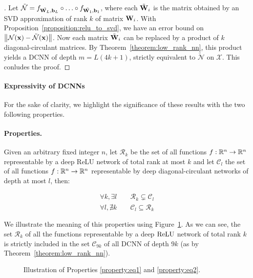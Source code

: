 \begin{proof}[]
Let $\tilde{\mathcal{N}} = f_{\tilde{\mathbf{W}_{L}},\mathbf{b}_{L}} \circ \ldots \circ f_{\tilde{\mathbf{W}_{1}},\mathbf{b}_{1}}$, where each $\tilde{\mathbf{W}}_{i}$ is the matrix obtained by an SVD approximation of rank $k$ of matrix $\mathbf{W}_{i}$.
With Proposition~\ref{proposition:relu_to_svd}, we have an error bound on $\norm{\mathcal{N} \left(\xvec\right) - \tilde{\mathcal{N}} \left(\xvec\right)}$.
Now each matrix $\tilde{\mathbf{W}}_{i}$ can be replaced by a product of $k$ diagonal-circulant matrices.
By Theorem~\ref{theorem:low_rank_nn}, this product yields a DCNN of depth $m = L(4k+1)$, strictly equivalent to $\tilde{\mathcal{N}}$ on $\mathcal{X}$.
This conludes the proof.
\end{proof}



\paragraph{Expressivity of DCNNs}

For the sake of clarity, we highlight the significance of these results with the two following properties.

\paragraph{Properties.}
Given an arbitrary fixed integer $n$, let $\mathcal{R}_{k}$ be the set of all functions $f:{\mathbb{R}}^{n} \rightarrow {\ensuremath \mathbb{R}}^{n}$ representable by a deep ReLU network of total rank at most $k$ and let $\mathcal{C}_{l}$ the set of all functions $f:{\mathbb{R}}^{n} \rightarrow {\ensuremath \mathbb{R}}^{n}$ representable by deep diagonal-circulant networks of depth at most $l$, then:

\begin{align}
  \label{property:eq1} \forall k,\exists l \, &\quad \mathcal{R}_{k} \subsetneq \mathcal{C}_{l} \\
  \label{property:eq2} \forall l,\nexists k\, &\quad \mathcal{C}_{l} \subseteq \mathcal{R}_{k}
\end{align}

We illustrate the meaning of this properties using Figure~\ref{figure:circfig}.
As we can see, the set $\mathcal R_{k}$ of all the functions representable by a deep $\operatorname{ReLU}$ network of total rank $k$ is strictly included in the set $\mathcal C_{9k}$ of all DCNN of depth $9k$ (as by Theorem~\ref{theorem:low_rank_nn}).

\begin{figure}[htb]
    \begin{center}
      
    \end{center}
    \caption{Illustration of Properties \ref{property:eq1} and \ref{property:eq2}.}
    \label{figure:circfig}
\end{figure}

